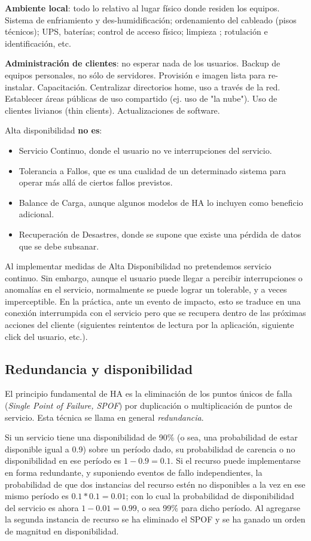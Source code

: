 {\bf Ambiente local}: todo lo relativo al lugar físico donde residen los equipos. Sistema de enfriamiento y des-humidificación; ordenamiento del cableado (pisos técnicos); UPS, baterías; control de acceso físico; limpieza ; rotulación e identificación, etc.

{\bf Administración de clientes}: no esperar nada de los usuarios. Backup de equipos personales, no sólo de servidores. Provisión e imagen lista para re-instalar. Capacitación. Centralizar directorios home, uso a través de la red. Establecer áreas públicas de uso compartido (ej. uso de "la nube"). Uso de clientes livianos (thin clients). Actualizaciones de software.   

Alta disponibilidad \textbf{no es}:
\begin{itemize}
	\item Servicio Continuo, donde el usuario no ve interrupciones del servicio.
	\item Tolerancia a Fallos, que es una cualidad de un determinado sistema para operar más allá de ciertos fallos previstos.
	\item Balance de Carga, aunque algunos modelos de HA lo incluyen como beneficio adicional.
	\item Recuperación de Desastres, donde se supone que existe una pérdida de datos que se debe subsanar.
\end{itemize}

Al implementar medidas de Alta Disponibilidad no pretendemos servicio continuo. Sin embargo, aunque el usuario puede llegar a percibir interrupciones o anomalías en el servicio, normalmente se puede lograr un  tolerable, y a veces imperceptible. En la práctica, ante un evento de impacto, esto se traduce en una conexión interrumpida con el servicio pero que se recupera dentro de las próximas acciones del cliente (siguientes reintentos de lectura por la aplicación, siguiente click del usuario, etc.). 

\subsection{Redundancia y disponibilidad}
El principio fundamental de HA es la eliminación de los puntos únicos de falla (\textit{Single Point of Failure, SPOF}) por duplicación o multiplicación de puntos de servicio. Esta técnica se llama en general \textit{redundancia}. 

Si un servicio tiene una disponibilidad de 90\% (o sea, una probabilidad de estar disponible igual a 0.9) sobre un período dado, su probabilidad de carencia o no disponibilidad en ese período es $1 - 0.9 = 0.1$. Si el recurso puede implementarse en forma redundante, y suponiendo eventos de fallo independientes, la probabilidad de que dos instancias del recurso estén no disponibles a la vez en ese mismo período es $0.1 * 0.1 = 0.01$; con lo cual la probabilidad de disponibilidad del servicio es ahora $1 - 0.01 = 0.99$, o sea 99\% para dicho período. Al agregarse la segunda instancia de recurso se ha eliminado el SPOF y se ha ganado un orden de magnitud en disponibilidad.
 
